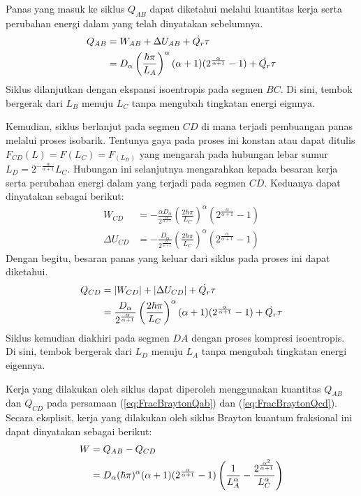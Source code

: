 Panas yang masuk ke siklus \(Q_{AB}\) dapat diketahui melalui kuantitas kerja serta perubahan energi dalam yang telah dinyatakan sebelumnya. 
\begin{align}
    Q_{AB} &= W_{AB} + \Delta U_{AB} + \dot{Q_r}\tau \notag \\
    &= D_\alpha\left(\frac{\hbar\pi}{L_A}\right)^\alpha (\alpha+1)(2^\frac{\alpha}{\alpha+1}-1) + \dot{Q_r}\tau \label{eq:FracBraytonQab}
\end{align}
Siklus dilanjutkan dengan ekspansi isoentropis pada segmen \(BC\). Di sini, tembok bergerak dari \(L_B\) menuju \(L_C\) tanpa mengubah tingkatan energi eignnya. 
\par Kemudian, siklus berlanjut pada segmen \(CD\) di mana terjadi pembuangan panas melalui proses isobarik. Tentunya gaya pada proses ini konstan atau dapat ditulis \(F_{CD}(L) = F(L_C) = F_(L_D)\) yang mengarah pada hubungan lebar sumur \(L_D = 2^{-\frac{\alpha}{\alpha+1}} L_C\). Hubungan ini selanjutnya mengarahkan kepada besaran kerja serta perubahan energi dalam yang terjadi pada segmen \(CD\). Keduanya dapat dinyatakan sebagai berikut:
\begin{align}
    W_{CD} &= - \frac{\alpha D_\alpha}{2^\frac{\alpha}{\alpha+1}} \left(\frac{2\hbar\pi}{L_C}\right)^\alpha (2^\frac{\alpha}{\alpha+1}-1) \\
    \Delta U_{CD} &= -\frac{D_\alpha}{2^\frac{\alpha}{\alpha+1}} \left(\frac{2\hbar\pi}{L_C}\right)^\alpha (2^\frac{\alpha}{\alpha+1}-1)
\end{align}
Dengan begitu, besaran panas yang keluar dari siklus pada proses ini dapat diketahui. 
\begin{align}
    Q_{CD} &= |W_{CD}| + |\Delta U_{CD}| + \dot{Q_r}\tau \notag \\
    &= \frac{D_\alpha}{2^\frac{\alpha}{\alpha+1}} \left(\frac{2\hbar\pi}{L_C}\right)^\alpha (\alpha+1)(2^\frac{\alpha}{\alpha+1}-1) + \dot{Q_r}\tau \label{eq:FracBraytonQcd}
\end{align}
Siklus kemudian diakhiri pada segmen \(DA\) dengan proses kompresi isoentropis. Di sini, tembok bergerak dari \(L_D\) menuju \(L_A\) tanpa mengubah tingkatan energi eigennya. 
\par Kerja yang dilakukan oleh siklus dapat diperoleh menggunakan kuantitas \(Q_{AB}\) dan \(Q_{CD}\) pada persamaan (\ref{eq:FracBraytonQab}) dan (\ref{eq:FracBraytonQcd}). Secara eksplisit, kerja yang dilakukan oleh siklus Brayton kuantum fraksional ini dapat dinyatakan sebagai berikut:
\begin{align}
    W &= Q_{AB} - Q_{CD} \notag \\
    &= D_\alpha(\hbar\pi)^\alpha (\alpha+1)(2^\frac{\alpha}{\alpha+1}-1) \left(\frac{1}{L_A^\alpha} - \frac{2^\frac{\alpha^2}{\alpha+1}}{L_C^\alpha}\right) \label{eq:FracBraytonW}
\end{align}
